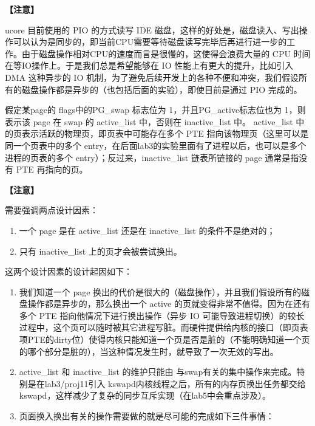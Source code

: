 \textbf{【注意】}

ucore 目前使用的 PIO 的方式读写 IDE
磁盘，这样的好处是，磁盘读入、写出操作可以认为是同步的，即当前CPU需要等待磁盘读写完毕后再进行进一步的工作。由于磁盘操作相对CPU的速度而言是很慢的，这使得会浪费大量的
CPU 时间在等IO操作上。于是我们总是希望能够在 IO
性能上有更大的提升，比如引入 DMA 这种异步的 IO
机制，为了避免后续开发上的各种不便和冲突，我们假设所有的磁盘操作都是异步的（也包括后面的实验），即使目前是通过
PIO 完成的。

假定某page的 flags中的PG\_swap 标志位为 1，并且PG\_active标志位也为
1，则表示该 page 在 swap 的 active\_list 中，否则在 inactive\_list 中。
active\_list 中的页表示活跃的物理页，即页表中可能存在多个 PTE
指向该物理页（这里可以是同一个页表中的多个
entry，在后面lab3的实验里面有了进程以后，也可以是多个进程的页表的多个
entry）；反过来，inactive\_list 链表所链接的 page 通常是指没有 PTE
再指向的页。

\textbf{【注意】}

需要强调两点设计因素：

\begin{enumerate}
\def\labelenumi{\arabic{enumi}.}
\tightlist
\item
  一个 page 是在 active\_list 还是在 inactive\_list 的条件不是绝对的；
\item
  只有 inactive\_list 上的页才会被尝试换出。
\end{enumerate}

这两个设计因素的设计起因如下：

\begin{enumerate}
\def\labelenumi{\arabic{enumi}.}
\tightlist
\item
  我们知道一个 page
  换出的代价是很大的（磁盘操作），并且我们假设所有的磁盘操作都是异步的，那么换出一个
  active 的页就变得非常不值得。因为在还有多个 PTE
  指向他情况下进行换出操作（异步 IO
  可能导致进程切换）的较长过程中，这个页可以随时被其它进程写脏。而硬件提供给内核的接口（即页表项PTE的dirty位）使得内核只能知道一个页是否是脏的（不能明确知道一个页的哪个部分是脏的），当这种情况发生时，就导致了一次无效的写出。
\item
  active\_list 和 inactive\_list 的维护只能由
  与swap有关的集中操作来完成。特别是在lab3/proj11引入
  kswapd内核线程之后，所有的内存页换出任务都交给kswapd，这样减少了复杂的同步互斥实现（在lab5中会重点涉及）。
\item
  页面换入换出有关的操作需要做的就是尽可能的完成如下三件事情：
\end{enumerate}

